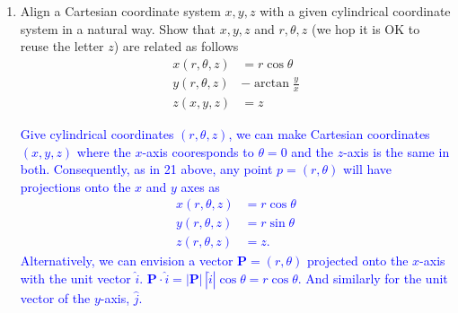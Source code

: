 \documentclass[12pt,a4paper]{report}
\newcommand{\BLUE}[1]{\textcolor{blue}{#1}}
\newcommand{\VK}[1]{\textbf{#1}}
\begin{document}
\begin{enumerate}[label=\textbf{3.\arabic*}]
\BLUE{\begin{align*}
	x(r,\theta)^2 + y(r, \theta)^2 &= r^2\cos^2\theta+r^2\sin^\theta = r^2 \implies r(x,y) = \sqrt{x^2+y^2}  \\
	\tan \theta &= \frac{\sin\theta}{\cos\theta} = \frac{r\sin\theta}{r\cos\theta} \frac{y}{x} \implies \theta = \arctan\frac{y}{x}
\end{align*}
}

\item Align a Cartesian coordinate system $x,y,z$ with a given cylindrical coordinate system in a natural way.  Show that $x,y,z$ and $r, \theta, z$ (we hop it is OK to reuse the letter $z$) are related as follows
\begin{align*}
	x(r,\theta,z) &= r\cos \theta\\
	y(r,\theta,z) &- \arctan\frac{y}{x} \\
	z(x,y,z) &= z
\end{align*}

\BLUE{Give cylindrical coordinates $(r, \theta, z)$, we can make Cartesian coordinates $(x,y,z)$ where the $x$-axis cooresponds to $\theta = 0$ and the $z$-axis is the same in both.  Consequently, as in 21 above, any point $p=(r, \theta)$  will have projections onto the $x$ and $y$ axes as 
\begin{align*}
	x(r, \theta, z) &= r\cos \theta \\
	y(r, \theta, z) &= r\sin \theta \\
	z(r, \theta, z) &= z.
\end{align*}Alternatively, we can envision a vector $\VK{P} = (r, \theta)$ projected onto the $x$-axis with the unit vector $\hat{i}$.  $\VK{P} \cdot \hat{i} = |\VK{P}|\,|\hat{i}|\cos\theta = r\cos\theta$. And similarly for the unit vector of the $y$-axis, $\hat{j}$.
}

\end{enumerate}
\HLINE
\end{document}
